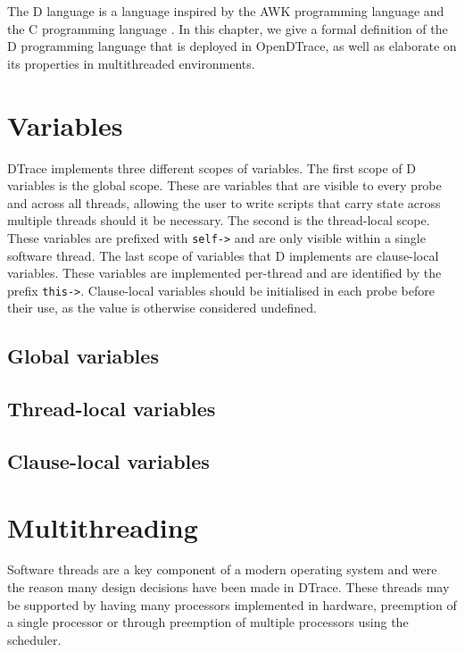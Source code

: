The D language is a language inspired by the AWK programming language
\cite{Aho:1987:APL:29361} and the C programming language
\cite{Kernighan:1988}. In this chapter, we give a formal definition of
the D programming language that is deployed in OpenDTrace, as well as
elaborate on its properties in multithreaded environments.


\section{Variables}
\label{sec:d-variables}
DTrace implements three different scopes of variables. The first scope of D variables
is the global scope. These are variables that are visible to every probe and across all
threads, allowing the user to write scripts that carry state across multiple threads should
it be necessary. The second is the thread-local scope. These variables are prefixed with
\texttt{self->} and are only visible within a single software thread. The last scope
of variables that D implements are clause-local variables. These variables are implemented
per-thread and are identified by the prefix \texttt{this->}. Clause-local variables should
be initialised in each probe before their use, as the value is otherwise considered undefined.


\subsection{Global variables}

\subsection{Thread-local variables}

\subsection{Clause-local variables}

\section{Multithreading}

Software threads are a key component of a modern operating system and were the
reason many design decisions have been made in DTrace. These threads may be
supported by having many processors implemented in hardware, preemption of a
single processor or through preemption of multiple processors using the
scheduler.

